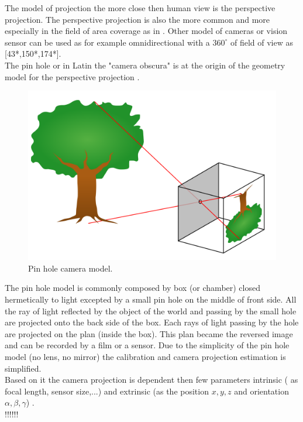 The model of projection the more close then human view is the perspective projection. The perspective projection is also the more common and more especially in the field of  area coverage as in \cite{101*topcuoglu2009,33*reddy2012,8*zhou2011,82*chrysostomou2012,22*zhao2008}. Other model of cameras or vision sensor can be used as for example omnidirectional  with a $360^{\circ}$ of field of view as [43*,150*,174*].  \\
The pin hole or in Latin the "camera obscura"  is at the origin of the geometry model for the perspective projection .\\
\begin{figure}[t!]
   \includegraphics[width=\linewidth]{img/PinholeCam.png}
  \caption{ Pin hole camera model.}\label{fig:PanTiltRoll}
  \endminipage\hfill
\end{figure} 
 The pin hole model is commonly composed by box (or chamber) closed hermetically to light excepted by a small pin hole on the middle of front side. All the ray of light reflected by the object of the world and passing by the small hole are projected onto the back side of the box. Each rays of light passing by the hole are  projected on the plan (inside the box). This plan became the reversed image and can be recorded by a film or a sensor. 
 Due to the simplicity of the pin hole model (no lens, no mirror) the calibration and camera projection  estimation is simplified.\\
  Based on it the camera projection is dependent then few parameters intrinsic ( as focal length, sensor size,...) and extrinsic (as the position $x,y,z$ and orientation $\alpha,\beta,\gamma$) . 
    \\ !!!!!!\\
